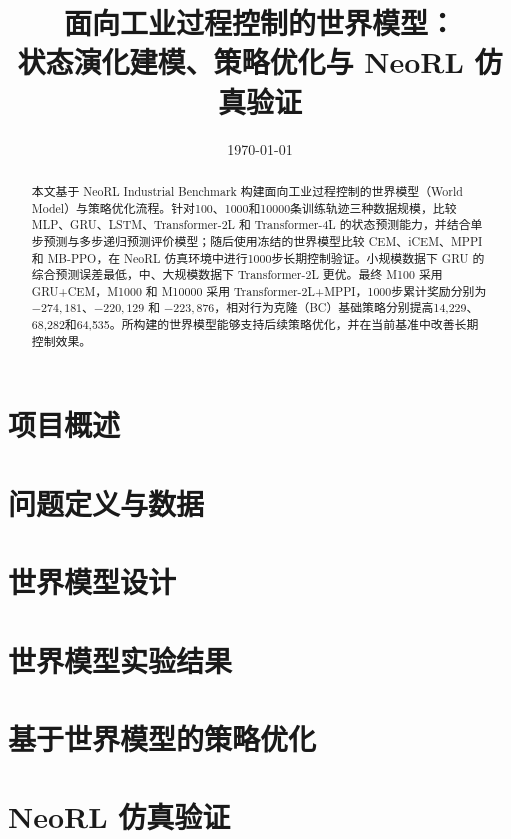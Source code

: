 \documentclass[11pt,a4paper,fontset=fandol]{ctexart}
\title{面向工业过程控制的世界模型：\\状态演化建模、策略优化与 NeoRL 仿真验证}
\author{}
\date{\today}
\begin{document}
\maketitle
\begin{abstract}
本文基于 NeoRL Industrial Benchmark 构建面向工业过程控制的世界模型（World Model）与策略优化流程。针对100、1000和10000条训练轨迹三种数据规模，比较 MLP、GRU、LSTM、Transformer-2L 和 Transformer-4L 的状态预测能力，并结合单步预测与多步递归预测评价模型；随后使用冻结的世界模型比较 CEM、iCEM、MPPI 和 MB-PPO，在 NeoRL 仿真环境中进行1000步长期控制验证。小规模数据下 GRU 的综合预测误差最低，中、大规模数据下 Transformer-2L 更优。最终 M100 采用 GRU+CEM，M1000 和 M10000 采用 Transformer-2L+MPPI，1000步累计奖励分别为 $-274{,}181$、$-220{,}129$ 和 $-223{,}876$，相对行为克隆（BC）基础策略分别提高14,229、68,282和64,535。所构建的世界模型能够支持后续策略优化，并在当前基准中改善长期控制效果。
\end{abstract}
\clearpage
\tableofcontents
\clearpage

\section{项目概述}
\label{sec:intro}


\section{问题定义与数据}
\label{sec:problem}


\section{世界模型设计}
\label{sec:wm_design}


\section{世界模型实验结果}
\label{sec:wm_exp}


\section{基于世界模型的策略优化}
\label{sec:strategy}


\section{NeoRL 仿真验证}
\label{sec:evaluation}

\end{document}
